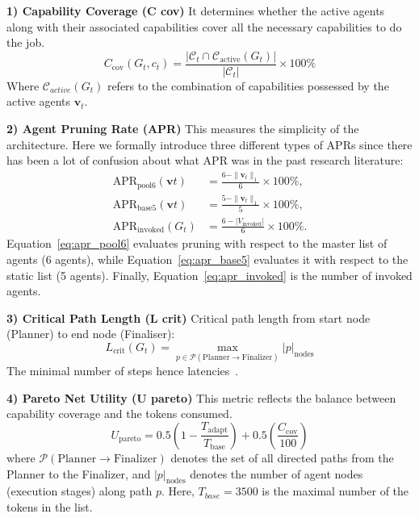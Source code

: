 \documentclass[conference]{IEEEtran}
\begin{document}
\textbf{1) Capability Coverage (C cov)}
It determines whether the active agents along with their associated capabilities cover all the necessary capabilities to do the job.
\begin{equation}
C_{\mathrm{cov}}(G_t, c_t) = \frac{|\mathcal{C}_t \cap \mathcal{C}_{\mathrm{active}}(G_t)|}{|\mathcal{C}_t|} \times 100\%
\end{equation}
Where $\mathcal{C}_{active}(G_t)$ refers to the combination of capabilities possessed by the active agents $\mathbf{v}_t$.

\textbf{2) Agent Pruning Rate (APR)}
This measures the simplicity of the architecture. Here we formally introduce three different types of APRs since there has been a lot of confusion about what APR was in the past research literature:
\begin{align}
\mathrm{APR}_{\mathrm{pool6}}(\mathbf{v}t) & = \frac{6 - \|\mathbf{v}_t\|_1}{6} \times 100\%, \label{eq:apr_pool6} \\ 
\mathrm{APR}_{\mathrm{base5}}(\mathbf{v}t) & = \frac{5 - \|\mathbf{v}_t\|_1}{5} \times 100\%, \label{eq:apr_base5} \\
\mathrm{APR}_{\mathrm{invoked}}(G_t) & = \frac{6 - |V_{\mathrm{invoked}}|}{6} \times 100\%. \label{eq:apr_invoked}
\end{align}
Equation~\eqref{eq:apr_pool6} evaluates pruning with respect to the master list of agents (6 agents), while Equation~\eqref{eq:apr_base5} evaluates it with respect to the static list (5 agents). Finally, Equation~\eqref{eq:apr_invoked} is the number of invoked agents.

\textbf{3) Critical Path Length (L crit)}
Critical path length from start node (Planner) to end node (Finaliser):
\begin{equation}
L_{\mathrm{crit}}(G_t)
=
\max_{p \in \mathcal{P}(\mathrm{Planner} \rightarrow \mathrm{Finalizer})}
|p|_{\mathrm{nodes}}
\label{eq:critical_path}
\end{equation}
The minimal number of steps hence latencies~\cite{Li2025AdaptiveGraphPruning}.

\textbf{4) Pareto Net Utility (U pareto)}
This metric reflects the balance between capability coverage and the tokens consumed.
\begin{equation}
U_{\mathrm{pareto}}
=
0.5 \left(1 - \frac{T_{\mathrm{adapt}}}{T_{\mathrm{base}}}\right)
+
0.5 \left(\frac{C_{\mathrm{cov}}}{100}\right)
\label{eq:pareto_utility}
\end{equation}
where $\mathcal{P}(\mathrm{Planner} \rightarrow \mathrm{Finalizer})$
denotes the set of all directed paths from the Planner to the
Finalizer, and $|p|_{\mathrm{nodes}}$ denotes the number of
agent nodes (execution stages) along path $p$.
Here, $T_{base} = 3500$ is the maximal number of the tokens in the list.
\end{document}
